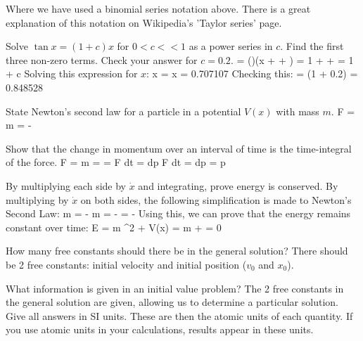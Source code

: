 \ee
Where we have used a binomial series notation above. There is a great explanation of this notation on Wikipedia's 'Taylor series' page.
\item Solve $\tan x = (1 +c) x$ for $0 < c << 1$ as a power series in $c$.  Find the first three non-zero terms.  Check your answer for $c=0.2$.
\be
{} = \left(\right)\left(x +  + \right) = 1 +  +  = 1 + c
\ee
Solving this expression for $x$:
\be
x =  \quad {} \quad x = 0.707107
\ee
Checking this: 
\be
\tan{\left(0.707107\right)} = (1 + 0.2)   = 0.848528
\ee
\enu
\newpage
\newpage
{}
\benu
\item State Newton's second law for a particle in a potential $V(x)$ with mass $m$.
\be
F = m  = -
\ee
\item Show that the change in momentum over an interval of time is the time-integral of the force.
\be
F  = m =  =  \thus F dt = dp \thus \int F dt = \int dp = \Delta p
\ee
\item By multiplying each side by $\dot x$ and integrating, prove energy is conserved.
\newline By multiplying by $\dot{x}$ on both sides, the following simplification is made to Newton's Second Law:
\be
m  = - \thus m   = -  = -
\ee
Using this, we can prove that the energy remains constant over time:
\be
E =  m ^2 + V(x) \thus {} = m   +  = 0
\ee
\item How many free constants should there be in the general solution?
\newline There should be 2 free constants: initial velocity and initial position ($v_0$ and $x_0$).
\item What information is given in an initial value problem?
\newline The 2 free constants in the general solution are given, allowing us to determine a particular solution.
\enu
\newpage
{}
Give all answers in SI units.
These are then the atomic units of each quantity.  If you use atomic units
in your calculations, results appear in these units.
